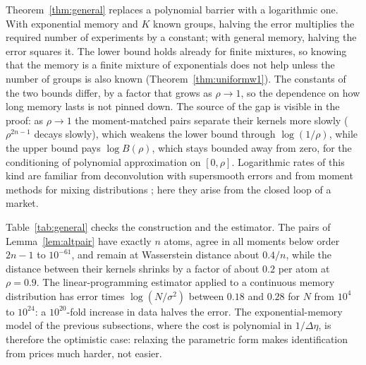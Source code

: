 \documentclass[12pt]{article}
\theoremstyle{definition}
\theoremstyle{remark}
\begin{document}
Theorem~\ref{thm:general} replaces a polynomial barrier with a logarithmic one. With exponential memory and $K$ known groups, halving the error multiplies the required number of experiments by a constant; with general memory, halving the error squares it. The lower bound holds already for finite mixtures, so knowing that the memory is a finite mixture of exponentials does not help unless the number of groups is also known (Theorem~\ref{thm:uniformw1}). The constants of the two bounds differ, by a factor that grows as $\rho\to1$, so the dependence on how long memory lasts is not pinned down. The source of the gap is visible in the proof: as $\rho\to1$ the moment-matched pairs separate their kernels more slowly ($\rho^{2n-1}$ decays slowly), which weakens the lower bound through $\log(1/\rho)$, while the upper bound pays $\log B(\rho)$, which stays bounded away from zero, for the conditioning of polynomial approximation on $[0,\rho]$. Logarithmic rates of this kind are familiar from deconvolution with supersmooth errors \citep{fan1991} and from moment methods for mixing distributions \citep{kong2017,wu2020}; here they arise from the closed loop of a market.

Table~\ref{tab:general} checks the construction and the estimator. The pairs of Lemma~\ref{lem:altpair} have exactly $n$ atoms, agree in all moments below order $2n-1$ to $10^{-61}$, and remain at Wasserstein distance about $0.4/n$, while the distance between their kernels shrinks by a factor of about $0.2$ per atom at $\rho=0.9$. The linear-programming estimator applied to a continuous memory distribution has error times $\log(N/\sigma^2)$ between $0.18$ and $0.28$ for $N$ from $10^4$ to $10^{24}$: a $10^{20}$-fold increase in data halves the error. The exponential-memory model of the previous subsections, where the cost is polynomial in $1/\Delta\eta$, is therefore the optimistic case: relaxing the parametric form makes identification from prices much harder, not easier.
\end{document}
